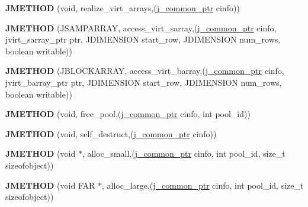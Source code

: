 \begin{DoxyCompactItemize}
{\bfseries J\+M\+E\+T\+H\+OD} (void, realize\+\_\+virt\+\_\+arrays,(\hyperlink{structjpeg__common__struct}{j\+\_\+common\+\_\+ptr} cinfo))
\item 
\mbox{\label{structjpeg__memory__mgr_a747ad4316a4794b13f9fdff4f6f699ca}} 
{\bfseries J\+M\+E\+T\+H\+OD} (J\+S\+A\+M\+P\+A\+R\+R\+AY, access\+\_\+virt\+\_\+sarray,(\hyperlink{structjpeg__common__struct}{j\+\_\+common\+\_\+ptr} cinfo, jvirt\+\_\+sarray\+\_\+ptr ptr, J\+D\+I\+M\+E\+N\+S\+I\+ON start\+\_\+row, J\+D\+I\+M\+E\+N\+S\+I\+ON num\+\_\+rows, boolean writable))
\item 
\mbox{\label{structjpeg__memory__mgr_aa460f4b500825e051306b8ce5583d052}} 
{\bfseries J\+M\+E\+T\+H\+OD} (J\+B\+L\+O\+C\+K\+A\+R\+R\+AY, access\+\_\+virt\+\_\+barray,(\hyperlink{structjpeg__common__struct}{j\+\_\+common\+\_\+ptr} cinfo, jvirt\+\_\+barray\+\_\+ptr ptr, J\+D\+I\+M\+E\+N\+S\+I\+ON start\+\_\+row, J\+D\+I\+M\+E\+N\+S\+I\+ON num\+\_\+rows, boolean writable))
\item 
\mbox{\label{structjpeg__memory__mgr_a7e7e063767441999982d22c5cc0e9423}} 
{\bfseries J\+M\+E\+T\+H\+OD} (void, free\+\_\+pool,(\hyperlink{structjpeg__common__struct}{j\+\_\+common\+\_\+ptr} cinfo, int pool\+\_\+id))
\item 
\mbox{\label{structjpeg__memory__mgr_ae80ddea0ba4f845f91d3a30e350b5f44}} 
{\bfseries J\+M\+E\+T\+H\+OD} (void, self\+\_\+destruct,(\hyperlink{structjpeg__common__struct}{j\+\_\+common\+\_\+ptr} cinfo))
\item 
\mbox{\label{structjpeg__memory__mgr_a9372ad24444dda23175cc9203105911c}} 
{\bfseries J\+M\+E\+T\+H\+OD} (void $\ast$, alloc\+\_\+small,(\hyperlink{structjpeg__common__struct}{j\+\_\+common\+\_\+ptr} cinfo, int pool\+\_\+id, size\+\_\+t sizeofobject))
\item 
\mbox{\label{structjpeg__memory__mgr_a130f6dbc700cc045bdbe35beff2cb326}} 
{\bfseries J\+M\+E\+T\+H\+OD} (void F\+AR $\ast$, alloc\+\_\+large,(\hyperlink{structjpeg__common__struct}{j\+\_\+common\+\_\+ptr} cinfo, int pool\+\_\+id, size\+\_\+t sizeofobject))
\item 
\mbox{\label{structjpeg__memory__mgr_a3fdd2e1dfdc089fd61f17b608c0263f2}} 

\end{DoxyCompactItemize}
